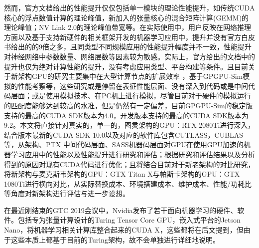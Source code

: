 \par 然而，官方文档给出的性能提升仅仅包括单一模块的理论性能提升，如传统CUDA核心的浮点数值计算的理论峰值，新加入的张量核心的混合矩阵计算(GEMM)的理论峰值；NV Link 2.0的理论峰值带宽等。在实际使用中，用户反映在网络推理方面以及基于支持新硬件的相关框架开发的机器学习应用中，提升并没有官方白皮书给出的的9倍之多\parencite{VOLTAWHITEPAPER}，且同类型不同规模应用的性能提升幅度并不一致，性能提升对神经网络中参数数量、网络层数等因素较为敏感。实际上，官方给出的文档中的提升也仅为绝对计算性能的提升，没有考虑应用类型、平台构建等条件。且目前关于新架构GPU的研究主要集中在大型计算节点的扩展效率 \parencite{EXASCLEDL}，基于GPGPU-Sim模拟的性能考察等\parencite{MODELING}，这些研究或是停留在表征性能层面、没有深入到代码或是中间代码层面；或是使用模拟技术、在PC机上进行模拟，尽管目前对于硬件的模拟运行的匹配度能够达到较高的水准，但是仍然有一定偏差，目前GPGPU-Sim的稳定版支持的最高的CUDA SDK版本为4.0，开发版本支持的最高的CUDA SDK版本为9.2。本文将直接针对真实的，单一的，图灵架构的GPU：RTX 2080Ti进行深入，结合版本最新的CUDA SDK 10.0以及对应的软件库包含CUTLASS，CUBLAS等，从架构、PTX 中间代码层面、SASS机器码层面对GPU在使用GPU加速的机器学习应用中的性能以及性能提升进行研究和评估；根据研究和评估结果以及分析得到的原因对现有CUDA代码进行优化；且将结合目前对于新老架构的对比研究\parencite{GRAVITATIONAL}，将新架构与麦克斯韦架构的GPU：GTX Titan X与帕斯卡架构的GPU：GTX 1080Ti进行横向对比，从实际替换成本、环境搭建成本、维护成本、性能/功耗比等角度对新架构进行评估与进一步设想。
\par 在最近刚结束的GTC 2019会议中，Nvidia发布了若干面向机器学习的硬件、软件。包括专为张量计算设计的Turing Tensor Core GPU，嵌入式平台的Jetson Nano\parencite{JETSONNANO}，将机器学习相关计算库整合起来的CUDA X\parencite{CUDAX}，这些都将在后文提到，但由于这些本质上都基于目前的Turing架构，故不会单独进行详细地说明。

